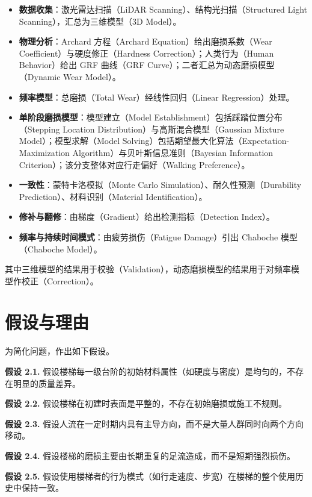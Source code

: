 \documentclass[11pt,a4paper]{ctexart}
\begin{document}
\begin{itemize}
\item \textbf{数据收集}：激光雷达扫描（LiDAR Scanning）、结构光扫描（Structured Light Scanning），汇总为三维模型（3D Model）。
\item \textbf{物理分析}：Archard 方程（Archard Equation）给出磨损系数（Wear Coefficient）与硬度修正（Hardness Correction）；人类行为（Human Behavior）给出 GRF 曲线（GRF Curve）；二者汇总为动态磨损模型（Dynamic Wear Model）。
\item \textbf{频率模型}：总磨损（Total Wear）经线性回归（Linear Regression）处理。
\item \textbf{单阶段磨损模型}：模型建立（Model Establishment）包括踩踏位置分布（Stepping Location Distribution）与高斯混合模型（Gaussian Mixture Model）；模型求解（Model Solving）包括期望最大化算法（Expectation-Maximization Algorithm）与贝叶斯信息准则（Bayesian Information Criterion）；该分支整体对应行走偏好（Walking Preference）。
\item \textbf{一致性}：蒙特卡洛模拟（Monte Carlo Simulation）、耐久性预测（Durability Prediction）、材料识别（Material Identification）。
\item \textbf{修补与翻修}：由梯度（Gradient）给出检测指标（Detection Index）。
\item \textbf{频率与持续时间模式}：由疲劳损伤（Fatigue Damage）引出 Chaboche 模型（Chaboche Model）。
\end{itemize}

其中三维模型的结果用于校验（Validation），动态磨损模型的结果用于对频率模型作校正（Correction）。

\section{假设与理由}

为简化问题，作出如下假设。

\noindent\textbf{假设 2.1.} 假设楼梯每一级台阶的初始材料属性（如硬度与密度）是均匀的，不存在明显的质量差异。

\noindent\textbf{假设 2.2.} 假设楼梯在初建时表面是平整的，不存在初始磨损或施工不规则。

\noindent\textbf{假设 2.3.} 假设人流在一定时期内具有主导方向，而不是大量人群同时向两个方向移动。

\noindent\textbf{假设 2.4.} 假设楼梯的磨损主要由长期重复的足流造成，而不是短期强烈损伤。

\noindent\textbf{假设 2.5.} 假设使用楼梯者的行为模式（如行走速度、步宽）在楼梯的整个使用历史中保持一致。
\end{document}
